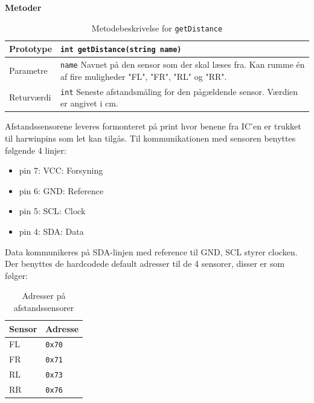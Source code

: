 \textbf{Metoder}

\begin{table}[h]
	\begin{tabularx}{\textwidth}{| L{2.5 cm} | Z |} \hline
		Prototype 	& \texttt{int getDistance(string name)} \\\hline
		Parametre 	& \texttt{name} \newline Navnet på den sensor som der skal læses fra. Kan rumme én af fire muligheder "FL", "FR", "RL" og "RR". \\\hline
		Returværdi 	& \texttt{int} \newline Seneste afstandsmåling for den pågældende sensor. Værdien er angivet i cm. \\\hline
	\end{tabularx}
	\caption{Metodebeskrivelse for \texttt{getDistance}}
	\label{table:met_getdistance}
\end{table}
\clearpage




Afstandssensorene leveres formonteret på print hvor benene fra IC'en er trukket til harwinpins som let kan tilgås. Til kommunikationen med sensoren benyttes følgende 4 linjer: 

\begin{itemize}
	\item pin 7: VCC: Forsyning
	\item pin 6: GND: Reference
	\item pin 5: SCL: Clock
	\item pin 4: SDA: Data
\end{itemize}

Data kommunikeres på SDA-linjen med reference til GND,  SCL styrer clocken.
Der benyttes de hardcodede default adresser til de 4 sensorer, disser er som følger: 

\begin{table}[h]\centering
	\begin{tabular}{| l | l |} \hline
		\textbf{Sensor} 	& \textbf{Adresse}  \\\hline
		FL 					& \texttt{0x70} 	\\\hline
		FR 					& \texttt{0x71} 	\\\hline
		RL 					& \texttt{0x73} 	\\\hline
		RR 					& \texttt{0x76} 	\\\hline
	\end{tabular}
	\caption{Adresser på afstandssensorer}
	\label{table:adr_afstandssensorer}
\end{table}

